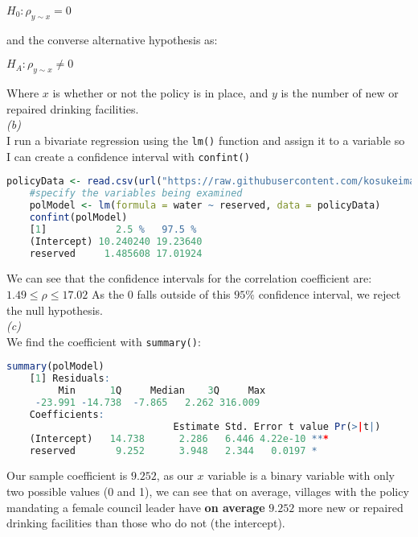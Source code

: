 \documentclass[12pt,letterpaper]{article}
\begin{document}
\noindent$H_{0} : \rho_{y \sim x} = 0$

\noindent and the converse alternative hypothesis as:

\noindent$H_{A} : \rho_{y \sim x} \neq 0$

\noindent Where $x$ is whether or not the policy is in place, and $y$ is the number of new or repaired drinking facilities.\\

\noindent\textit{(b)}\\ 


\noindent I run a bivariate regression using the \texttt{lm()} function and assign it to a variable so I can create a confidence interval with \texttt{confint()}

\begin{lstlisting}[language=R]
	policyData <- read.csv(url("https://raw.githubusercontent.com/kosukeimai/qss/master/PREDICTION/women.csv"))
	#specify the variables being examined
	polModel <- lm(formula = water ~ reserved, data = policyData)
	confint(polModel)
	[1]            2.5 %   97.5 %
	(Intercept) 10.240240 19.23640
	reserved     1.485608 17.01924
\end{lstlisting}

\noindent We can see that the confidence intervals for the correlation coefficient are: $1.49 \leq \rho \leq 17.02$
As the $0$ falls outside of this $95\%$ confidence interval, we reject the null hypothesis.\\

\noindent\textit{(c)}\\ 

\noindent We find the coefficient with \texttt{summary()}:

\begin{lstlisting}[language=R]
	summary(polModel)
	[1] Residuals:   
		 Min      1Q     Median    3Q     Max 
	 -23.991 -14.738  -7.865   2.262 316.009 
	Coefficients:            
							 Estimate Std. Error t value Pr(>|t|)    
	(Intercept)   14.738      2.286   6.446 4.22e-10 ***
	reserved       9.252      3.948   2.344   0.0197 *  
\end{lstlisting}

\noindent Our sample coefficient is $9.252$, as our $x$ variable is a binary variable with only two possible values (0 and 1), we can see that on average, villages with the policy mandating a female council leader have \textbf{on average} $9.252$ more new or repaired drinking facilities than those who do not (the intercept).
\clearpage
\end{document}
